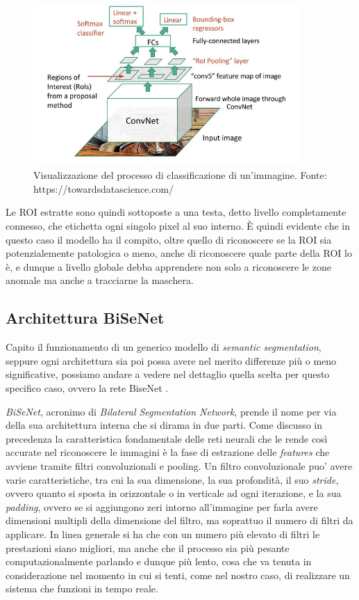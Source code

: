 \begin{figure}[ht]
    \centering
    \includegraphics[width=0.9\textwidth]{./assets/cnn.jpg}
    \caption{\label{fig:cnn}Visualizzazione del processo di classificazione di un'immagine. Fonte: https://towardsdatascience.com/}
\end{figure}

Le ROI estratte sono quindi sottoposte a una testa, detto livello
completamente connesso, che etichetta ogni singolo pixel al suo
interno.
È quindi evidente che in questo caso il modello ha il compito,
oltre quello di riconoscere se la ROI sia potenzialemente patologica
o meno, anche di riconoscere quale parte della ROI lo è, e dunque
a livello globale debba apprendere non solo a riconoscere le zone
anomale ma anche a tracciarne la maschera.



\subsection{\label{sec:bisenet}Architettura BiSeNet}

Capito il funzionamento di un generico modello di
{\it semantic segmentation}, seppure ogni architettura sia poi
possa avere nel merito differenze più o meno significative,
possiamo andare a vedere nel dettaglio quella scelta per 
questo specifico caso, ovvero la rete BiseNet \cite{bisenet}.

{\it BiSeNet}\cite{bisenet}, acronimo di
{\it Bilateral Segmentation Network}, prende il nome per via
della sua architettura interna che si dirama in due parti.
Come discusso in precedenza la caratteristica fondamentale
delle reti neurali che le rende così accurate nel riconoscere
le immagini è la fase di estrazione delle {\it features} che avviene
tramite filtri convoluzionali e pooling.
Un filtro convoluzionale puo' avere varie caratteristiche,
tra cui la sua dimensione, la sua profondità, il suo {\it stride},
ovvero quanto si sposta in orizzontale o in verticale ad ogni
iterazione, e la sua {\it padding}, ovvero se si aggiungono
zeri intorno all'immagine per farla avere dimensioni multipli
della dimensione del filtro, ma soprattuo il numero di filtri da
applicare.
In linea generale si ha che con un numero più elevato di filtri
le prestazioni siano migliori, ma anche che il processo
sia più pesante computazionalmente parlando e dunque più
lento, cosa che va tenuta in considerazione nel momento in cui 
si tenti, come nel nostro caso, di realizzare un sistema che funzioni
in tempo reale.


